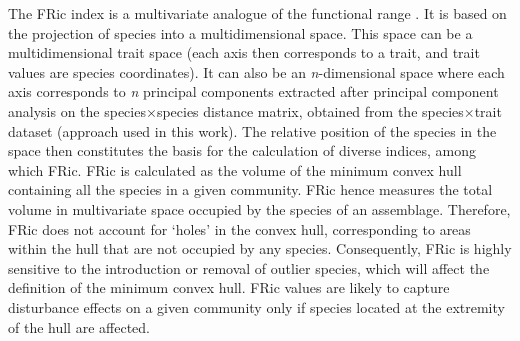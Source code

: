 The FRic index is a multivariate analogue of the functional range \citep{Legras2018, Villeger2008, Schleuter2010}. It is based on the projection of species into a multidimensional space. This space can be a multidimensional trait space (each axis then corresponds to a trait, and trait values are species coordinates). It can also be an \textit{n}-dimensional space where each axis corresponds to \textit{n} principal components extracted after principal component analysis on the species$\times$species distance matrix, obtained from the species$\times$trait dataset (approach used in this work). The relative position of the species in the space then constitutes the basis for the calculation of diverse indices, among which FRic. 
FRic is calculated as the volume of the minimum convex hull containing all the species in a given community. FRic hence measures the total volume in multivariate space occupied by the species of an assemblage. Therefore, FRic does not account for `holes' in the convex hull, corresponding to areas within the hull that are not occupied by any species. Consequently, FRic is highly sensitive to the introduction or removal of outlier species, which will affect the definition of the minimum convex hull. FRic values are likely to capture disturbance effects on a given community only if species located at the extremity of the hull are affected.
\vspace{0.5cm}
